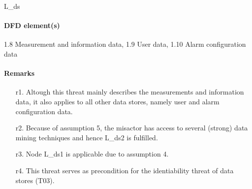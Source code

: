 L\_ds

\paragraph{DFD element(s)}

1.8 Measurement and information data, 1.9 User data, 1.10 Alarm configuration
data

\paragraph{Remarks}

	\begin{enumerate}
         \item[r1.] Altough this threat mainly describes the measurements
         and information data, it also applies to all other data stores, namely
         user and alarm configuration data.
         \item[r2.] Because of assumption 5, the misactor has access to several
         (strong) data mining techniques and hence L\_ds2 is fulfilled.
         \item[r3.] Node L\_ds1 is applicable due to assumption 4.
         \item[r4.] This threat serves as precondition for the
         identiability threat of data stores (T03).
    \end{enumerate}
